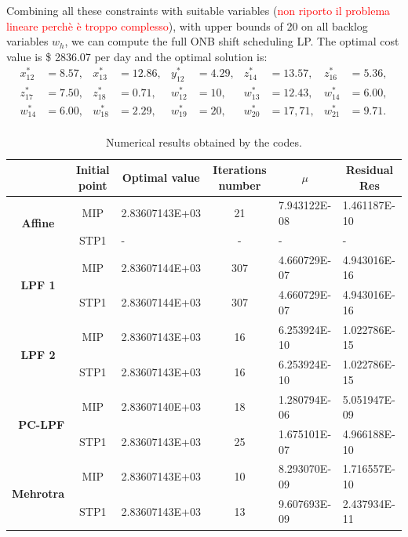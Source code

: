 \documentclass[a4paper,10 pt,titlepage,twoside]{book}
\theoremstyle{plain}
\theoremstyle{definition}
\theoremstyle{remark}
\begin{document}
Combining all these constraints with suitable variables (\textcolor{red}{non riporto il problema lineare perchè è troppo complesso}), with upper bounds of 20 on all backlog variables $w_{h}$, we can compute the full ONB shift scheduling LP. The optimal cost value is \$ 2836.07 per day and the optimal solution is:
\begin{align*}
x_{12}^{*} &=  8.57, & x_{13}^{*}&=  12.86, & y_{12}^{*} &= 4.29, & z_{14}^{*} &= 13.57, &z_{16}^{*} &= 5.36,\\
z_{17}^{*} &= 7.50, & z_{18}^{*}&= 0.71,  & w_{12}^{*} &= 10, & w_{13}^{*} &= 12.43, &w_{14}^{*} &=  6.00,\\
w_{14}^{*} &=  6.00, & w_{18}^{*}&=  2.29, & w_{19}^{*} &= 20, & w_{20}^{*} &= 17,71, &w_{21}^{*} &= 9.71.\\
\end{align*}
\begin{table}[]\caption{\label{table:ONB}Numerical results obtained by the codes.}
	\begin{tabular}{cclcll}
		\hline		\textbf{} & \textbf{Initial point} & \multicolumn{1}{c}{\textbf{Optimal value}} & \textbf{Iterations number} & \multicolumn{1}{c}{\textbf{$\mu$}} & \multicolumn{1}{c}{\textbf{Residual} Res} \\ \hline
		\multicolumn{1}{c|}{\multirow{2}{*}{\textbf{Affine}}} & MIP & 2.83607143E+03 & 21 & 7.943122E-08 & 1.461187E-10 \\
		\multicolumn{1}{c|}{} & STP1 & - & - & - & - \\ \hline
		\multicolumn{1}{c|}{\multirow{2}{*}{\textbf{LPF 1}}} & MIP & 2.83607144E+03 & 307 & 4.660729E-07 & 4.943016E-16 \\
		\multicolumn{1}{c|}{} & STP1 & 2.83607144E+03 & 307 & 4.660729E-07 & 4.943016E-16 \\ \hline
		\multicolumn{1}{c|}{\multirow{2}{*}{\textbf{LPF 2}}} & MIP & 2.83607143E+03 & 16 & 6.253924E-10 & 1.022786E-15 \\
		\multicolumn{1}{c|}{} & STP1 & 2.83607143E+03 & 16 & 6.253924E-10 & 1.022786E-15 \\ \hline
		\multicolumn{1}{r|}{\multirow{2}{*}{\textbf{PC-LPF}}} & MIP & 2.83607140E+03 & 18 & 1.280794E-06 & 5.051947E-09 \\
		\multicolumn{1}{r|}{} & STP1 & 2.83607143E+03 & 25 & 1.675101E-07 & 4.966188E-10 \\ \hline
		\multicolumn{1}{c|}{\multirow{2}{*}{\textbf{Mehrotra}}} & MIP & 2.83607143E+03 & 10 & 8.293070E-09 & 1.716557E-10 \\
		\multicolumn{1}{c|}{} & STP1 & 2.83607143E+03  & 13 & 9.607693E-09 & 2.437934E-11 \\ \hline
	\end{tabular}
\end{table}
\end{document}
